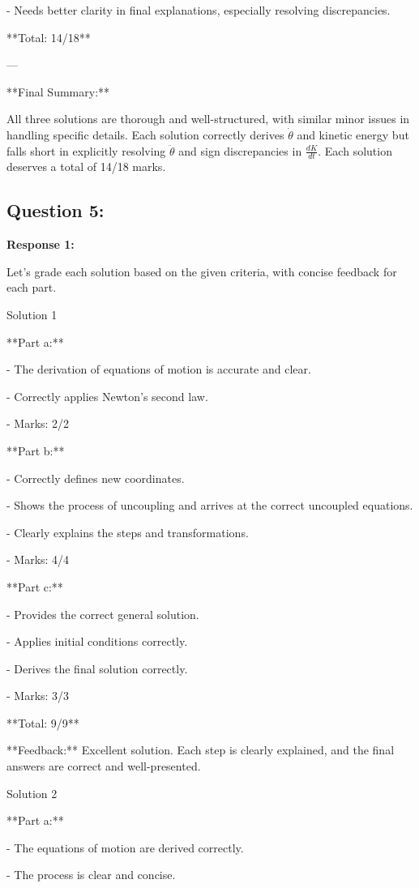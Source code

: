 \documentclass[a4paper,11pt]{article}
\begin{document}
- Needs better clarity in final explanations, especially resolving discrepancies.

**Total: 14/18**

---

**Final Summary:**

All three solutions are thorough and well-structured, with similar minor issues in handling specific details. Each solution correctly derives \(\dot{\theta}\) and kinetic energy but falls short in explicitly resolving \(\ddot{\theta}\) and sign discrepancies in \(\frac{dK}{dt}\). Each solution deserves a total of 14/18 marks.

\subsection*{Question 5:}

\textbf{Response 1:}

Let's grade each solution based on the given criteria, with concise feedback for each part.

Solution 1

**Part a:**

- The derivation of equations of motion is accurate and clear.

- Correctly applies Newton's second law.

- Marks: 2/2

**Part b:**

- Correctly defines new coordinates.

- Shows the process of uncoupling and arrives at the correct uncoupled equations.

- Clearly explains the steps and transformations.

- Marks: 4/4

**Part c:**

- Provides the correct general solution.

- Applies initial conditions correctly.

- Derives the final solution correctly.

- Marks: 3/3

**Total: 9/9**

**Feedback:** Excellent solution. Each step is clearly explained, and the final answers are correct and well-presented.

Solution 2

**Part a:**

- The equations of motion are derived correctly.

- The process is clear and concise.
\end{document}
